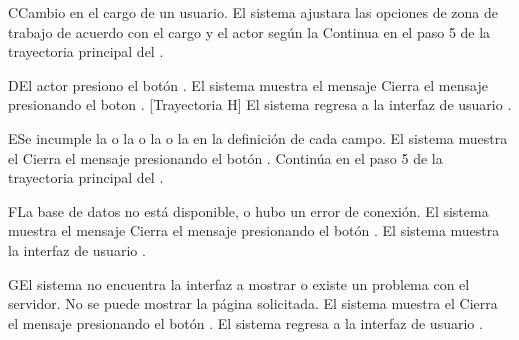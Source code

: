 \begin{UCtrayectoriaA}{C}{Cambio en el cargo de un usuario.}
    \UCpaso     El sistema ajustara las opciones de zona de trabajo de acuerdo con el cargo y el actor según la 
    \UCpaso     Continua en el paso 5 de la trayectoria principal del .
\end{UCtrayectoriaA}


\begin{UCtrayectoriaA}{D}{El actor presiono el botón .}
	\UCpaso El sistema muestra el mensaje 
	\UCpaso[\UCactor] Cierra el mensaje presionando el boton  . [Trayectoria H]
	\UCpaso El sistema regresa a la interfaz de usuario .
\end{UCtrayectoriaA}

\begin{UCtrayectoriaA}{E}{Se incumple la  o la   o la   o la  en la definición de cada campo.}
	\UCpaso El sistema muestra el 
	\UCpaso[\UCactor] Cierra el mensaje presionando el botón .
	\UCpaso Continúa en el paso 5 de la trayectoria principal del .
\end{UCtrayectoriaA}




\begin{UCtrayectoriaA}{F}{La base de datos no está disponible, o hubo un error de conexión.}
    \UCpaso El sistema muestra el mensaje
    \UCpaso[\UCactor] Cierra el mensaje presionando el botón .
    \UCpaso El sistema muestra  la interfaz de usuario  .
\end{UCtrayectoriaA}

\begin{UCtrayectoriaA}{G}{El sistema no encuentra la interfaz a mostrar o existe un problema con el servidor.}
    \UCpaso No se puede mostrar la página solicitada.
    \UCpaso El sistema muestra el 
    \UCpaso[\UCactor] Cierra el mensaje presionando el botón .
    \UCpaso El sistema regresa a la interfaz de usuario .
\end{UCtrayectoriaA}

